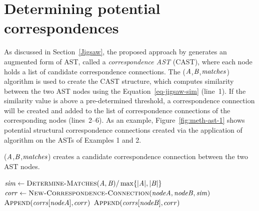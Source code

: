 \section{Determining potential correspondences}  \label{jigsaw-corr}

As discussed in Section~\ref{Jigsaw}, the proposed approach by \citet{2008:fse:cottrell} generates an augmented form of AST, called a \emph{correspondence AST} (CAST), where each node holds a list of candidate correspondence connections. The ($\mathit{A}$,$\mathit{B}$,$\mathit{matches}$) algorithm is used to create the CAST structure, which computes similarity between the two AST nodes using the Equation~\ref{eq-jigsaw-sim} (line~1). If the similarity value is above a pre-determined threshold, a correspondence connection will be created and added to the list of correspondence connections of the corresponding nodes (lines~2--6). As an example, Figure~\ref{fig:meth-ast-1} shows potential structural correspondence connections created via the application of  algorithm on the ASTs of Examples 1 and 2.


\begin{algorithm}
  \caption{($\mathit{A}$,$\mathit{B}$,$\mathit{matches}$) creates a candidate correspondence connection between the two AST nodes.}
  \label{computeMatches}
  \begin{algorithmic}[1]
  \DeterminePotentialCorrespondences
\State $\mathit{sim} \gets \textsc{Determine-Matches}(\mathit{A},\mathit{B})/\max\{{|\mathit{A}|, |\mathit{B}|}\}$	
 		\State $\mathit{corr} \gets \textsc{New-Correspondence-Connection}(\mathit{nodeA},\mathit{nodeB},\mathit{sim})$	
 \State $\textsc{Append}(\mathit{corrs}[\mathit{nodeA}],corr)$	
 \State $\textsc{Append}(\mathit{corrs}[\mathit{nodeB}],corr)$
 		\EndIf 		


	
  \end{algorithmic}
\end{algorithm}



